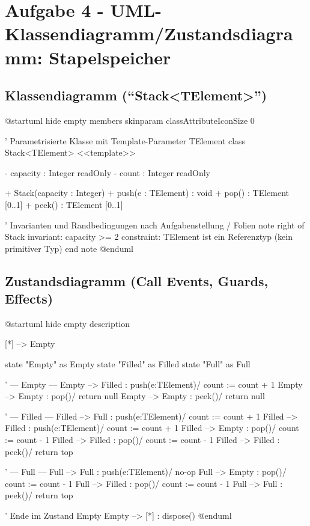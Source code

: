 \documentclass[12pt]{article}
\begin{document}
\section*{Aufgabe 4 - UML-Klassendiagramm/Zustandsdiagramm: Stapelspeicher}

\subsection*{Klassendiagramm (\enquote{Stack<TElement>})}
\def\PlantUMLJobname{SWT-class}
\begin{plantuml}
@startuml
hide empty members
skinparam classAttributeIconSize 0

' Parametrisierte Klasse mit Template-Parameter TElement
class Stack<TElement> <<template>> {
  - capacity : Integer {readOnly}
  - count    : Integer {readOnly}

  + Stack(capacity : Integer)
  + push(e : TElement) : void
  + pop()  : TElement [0..1]
  + peek() : TElement [0..1]
}

' Invarianten und Randbedingungen nach Aufgabenstellung / Folien
note right of Stack
  {invariant: capacity >= 2}
  {constraint: TElement ist ein Referenztyp (kein primitiver Typ)}
end note
@enduml
\end{plantuml}

\subsection*{Zustandsdiagramm (Call Events, Guards, Effects)}
\def\PlantUMLJobname{SWT-states}
\begin{plantuml}
@startuml
hide empty description

[*] --> Empty

state "Empty" as Empty
state "Filled" as Filled
state "Full" as Full

' --- Empty ---
Empty --> Filled : push(e:TElement)\n/ count := count + 1
Empty --> Empty  : pop()\n[count == 0]\n/ return null
Empty --> Empty  : peek()\n[count == 0]\n/ return null

' --- Filled ---
Filled --> Full   : push(e:TElement)\n[count + 1 == capacity]\n/ count := count + 1
Filled --> Filled : push(e:TElement)\n/ count := count + 1
Filled --> Empty  : pop()\n[count - 1 == 0]\n/ count := count - 1
Filled --> Filled : pop()\n[count - 1  > 0]\n/ count := count - 1
Filled --> Filled : peek()\n[count > 0]\n/ return top

' --- Full ---
Full --> Full   : push(e:TElement)\n[count == capacity]\n/ no-op
Full --> Empty  : pop()\n[count - 1 == 0]\n/ count := count - 1
Full --> Filled : pop()\n[count - 1  > 0]\n/ count := count - 1
Full --> Full   : peek()\n[count > 0]\n/ return top

' Ende im Zustand Empty
Empty --> [*] : dispose()
@enduml
\end{plantuml}
\end{document}
